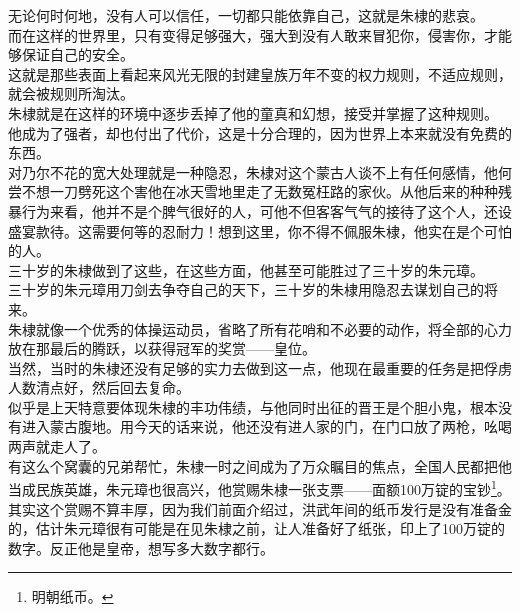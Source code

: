\begin{multicols}{\theparacolNo}
无论何时何地，没有人可以信任，一切都只能依靠自己，这就是朱棣的悲哀。\\

而在这样的世界里，只有变得足够强大，强大到没有人敢来冒犯你，侵害你，才能够保证自己的安全。\\

这就是那些表面上看起来风光无限的封建皇族万年不变的权力规则，不适应规则，就会被规则所淘汰。\\

朱棣就是在这样的环境中逐步丢掉了他的童真和幻想，接受并掌握了这种规则。\\

他成为了强者，却也付出了代价，这是十分合理的，因为世界上本来就没有免费的东西。\\

对乃尔不花的宽大处理就是一种隐忍，朱棣对这个蒙古人谈不上有任何感情，他何尝不想一刀劈死这个害他在冰天雪地里走了无数冤枉路的家伙。从他后来的种种残暴行为来看，他并不是个脾气很好的人，可他不但客客气气的接待了这个人，还设盛宴款待。这需要何等的忍耐力！想到这里，你不得不佩服朱棣，他实在是个可怕的人。\\

三十岁的朱棣做到了这些，在这些方面，他甚至可能胜过了三十岁的朱元璋。\\

三十岁的朱元璋用刀剑去争夺自己的天下，三十岁的朱棣用隐忍去谋划自己的将来。\\

朱棣就像一个优秀的体操运动员，省略了所有花哨和不必要的动作，将全部的心力放在那最后的腾跃，以获得冠军的奖赏——皇位。\\

当然，当时的朱棣还没有足够的实力去做到这一点，他现在最重要的任务是把俘虏人数清点好，然后回去复命。\\

似乎是上天特意要体现朱棣的丰功伟绩，与他同时出征的晋王是个胆小鬼，根本没有进入蒙古腹地。用今天的话来说，他还没有进人家的门，在门口放了两枪，吆喝两声就走人了。\\

有这么个窝囊的兄弟帮忙，朱棣一时之间成为了万众瞩目的焦点，全国人民都把他当成民族英雄，朱元璋也很高兴，他赏赐朱棣一张支票——面额100万锭的宝钞\footnote{明朝纸币。}。\\

其实这个赏赐不算丰厚，因为我们前面介绍过，洪武年间的纸币发行是没有准备金的，估计朱元璋很有可能是在见朱棣之前，让人准备好了纸张，印上了100万锭的数字。反正他是皇帝，想写多大数字都行。\\


\end{multicols}
